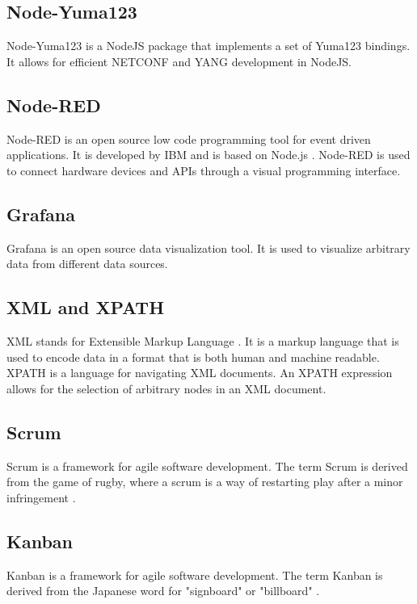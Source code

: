 \documentclass[12pt]{article}
\begin{document}
\subsection{Node-Yuma123}
Node-Yuma123 \cite{Nodeyuma1232025} is a NodeJS package that implements a set of Yuma123 bindings.
It allows for efficient NETCONF and YANG development in NodeJS.

\subsection{Node-RED}
Node-RED \cite{LowcodeProgrammingEventdriven} is an open source low code programming tool for event driven applications.
It is developed by IBM and is based on Node.js \cite{NodejsRunJavaScript}.
Node-RED is used to connect hardware devices and APIs through a visual programming interface.

\subsection{Grafana}
Grafana \cite{GrafanaOpenComposable} is an open source data visualization tool.
It is used to visualize arbitrary data from different data sources.

\subsection{XML and XPATH}
XML stands for Extensible Markup Language \cite{ExtensibleMarkupLanguage}. It is a
markup language that is used to encode data in a format that is both human and machine readable.
XPATH \cite{XMLPathLanguage} is a language for navigating XML documents.
An XPATH expression allows for the selection of arbitrary nodes in an XML document.

\subsection{Scrum}
Scrum \cite{HomeScrumorg} is a framework for agile \cite{AgileSoftwareDevelopment2025} software development. 
The term Scrum is derived from the game of rugby, where a scrum is a way of restarting play after a minor infringement \cite{ScrumRugbyUnion2025}.

\subsection{Kanban}
Kanban \cite{Kanban2025} is a framework for agile software development.
The term Kanban is derived from the Japanese word for "signboard" or "billboard" \cite{KanbanDevelopment2025}.
\end{document}
